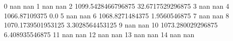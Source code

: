 0 nan nan
1 nan nan
2 1099.5428466796875 32.6717529296875
3 nan nan
4 1066.87109375 0.0
5 nan nan
6 1068.8271484375 1.9560546875
7 nan nan
8 1070.1739501953125 3.3028564453125
9 nan nan
10 1073.280029296875 6.408935546875
11 nan nan
12 nan nan
13 nan nan
14 nan nan

